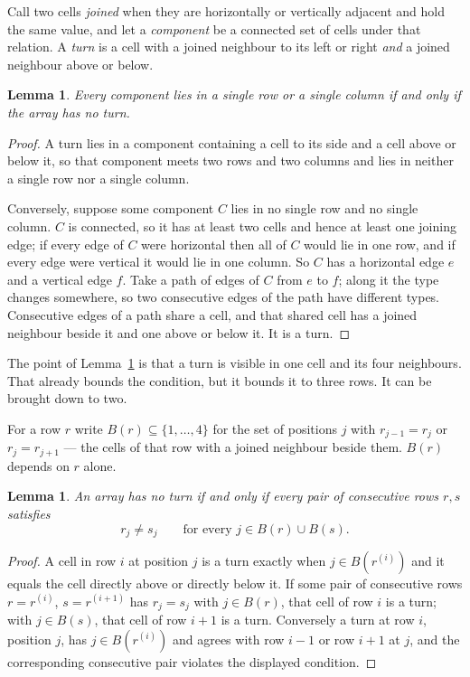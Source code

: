\documentclass[11pt,a4paper]{article}
\theoremstyle{plain}
\newtheorem{lemma}[theorem]{Lemma}
\theoremstyle{definition}
\begin{document}
Call two cells \emph{joined} when they are horizontally or vertically adjacent and hold the same value, and let a \emph{component} be a connected set of cells under that relation. A \emph{turn} is a cell with a joined neighbour to its left or right \emph{and} a joined neighbour above or below.

\begin{lemma}\label{lem:turn}
Every component lies in a single row or a single column if and only if the array has no turn.
\end{lemma}

\begin{proof}
A turn lies in a component containing a cell to its side and a cell above or below it, so that component meets two rows and two columns and lies in neither a single row nor a single column.

Conversely, suppose some component $C$ lies in no single row and no single column. $C$ is connected, so it has at least two cells and hence at least one joining edge; if every edge of $C$ were horizontal then all of $C$ would lie in one row, and if every edge were vertical it would lie in one column. So $C$ has a horizontal edge $e$ and a vertical edge $f$. Take a path of edges of $C$ from $e$ to $f$; along it the type changes somewhere, so two consecutive edges of the path have different types. Consecutive edges of a path share a cell, and that shared cell has a joined neighbour beside it and one above or below it. It is a turn.
\end{proof}

The point of Lemma~\ref{lem:turn} is that a turn is visible in one cell and its four neighbours. That already bounds the condition, but it bounds it to three rows. It can be brought down to two.

For a row $r$ write $B(r)\subseteq\{1,\dots,4\}$ for the set of positions $j$ with $r_{j-1}=r_j$ or $r_j=r_{j+1}$ --- the cells of that row with a joined neighbour beside them. $B(r)$ depends on $r$ alone.

\begin{lemma}\label{lem:pair}
An array has no turn if and only if every pair of consecutive rows $r,s$ satisfies
\[ r_j \neq s_j \qquad\text{for every } j \in B(r)\cup B(s). \]
\end{lemma}

\begin{proof}
A cell in row $i$ at position $j$ is a turn exactly when $j\in B(r^{(i)})$ and it equals the cell directly above or directly below it. If some pair of consecutive rows $r=r^{(i)}$, $s=r^{(i+1)}$ has $r_j=s_j$ with $j\in B(r)$, that cell of row $i$ is a turn; with $j\in B(s)$, that cell of row $i+1$ is a turn. Conversely a turn at row $i$, position $j$, has $j\in B(r^{(i)})$ and agrees with row $i-1$ or row $i+1$ at $j$, and the corresponding consecutive pair violates the displayed condition.
\end{proof}
\end{document}

